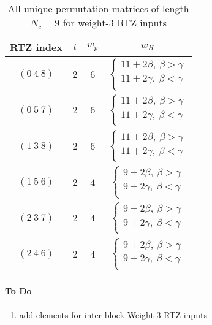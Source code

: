 \documentclass[11pt, oneside, dvipdfmx]{book}
\begin{document}
\begin{table}
\centering
\begin{tabular}{||c |c  |c  |c |} 
 \hline
 RTZ index  & $ l$ & $w_p$& $w_H$\\
 \hline
 $(0~4~8)$ & $2$ & $6$ & $
\begin{cases}
11+2\beta,~\beta>\gamma \\
11+2\gamma ,~\beta<\gamma\\
\end{cases}$\\
 \hline
 $(0~5~7)$ &  $2$ & $6$ & $\begin{cases}
11+2\beta,~\beta>\gamma \\
11+2\gamma,~\beta<\gamma\\
\end{cases}$\\
 \hline
 $(1~3~8)$ &  $2$ & $6$ & $\begin{cases}
11+2\beta,~\beta>\gamma \\
11+2\gamma,~\beta<\gamma\\
\end{cases}$\\
 \hline
 $(1~5~6)$ &  $2$ & $4$ & $
 \begin{cases}
9+2\beta,~\beta>\gamma \\
9+2\gamma,~\beta<\gamma\\
\end{cases}$\\
 \hline
 $(2~3~7)$ & $2$ & $4$ & $ 
 \begin{cases}
9+2\beta,~\beta>\gamma \\
9+2\gamma,~\beta<\gamma\\
\end{cases}$\\
 \hline
 $(2~4~6)$ & $2$ & $4$ & $ 
 \begin{cases}
9+2\beta,~\beta>\gamma \\
9+2\gamma,~\beta<\gamma\\
\end{cases}$\\
 \hline
\end{tabular}
\caption{All unique permutation matrices of length $N_c =9$ for weight-$3$ RTZ inputs}
\label{tb3}
\end{table}

\paragraph{To Do}
\begin{enumerate}
\item add elements for inter-block Weight-3 RTZ inputs
\end{enumerate}
 
\end{document}
